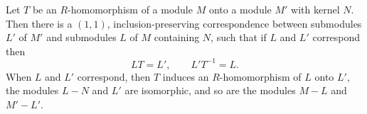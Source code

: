 Let $T$ be an $R$-homomorphism of a module $M$ onto a module $M'$ with kernel $N$. Then there is a $(1,1)$, inclusion-preserving correspondence between submodules $L'$ of $M'$ and submodules $L$ of $M$ containing $N$, such that if $L$ and $L'$ correspond then
$$
LT = L', \qquad L'T^{-1} = L.
$$
When $L$ and $L'$ correspond, then $T$ induces an $R$-homomorphism of $L$ onto $L'$, the modules $L - N$ and $L'$ are isomorphic, and so are the modules $M - L$ and $M' - L'$.
